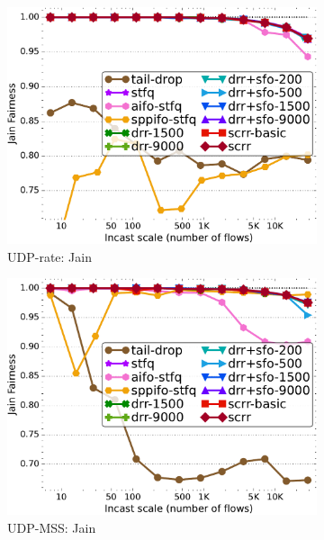 \begin{figure}[th!]
  \centering
  \begin{subfigure}[t]{.30\linewidth}
    \centering
    \includegraphics[width=0.95\linewidth]{figs/paral_cn_6u4x1024_Cb_7G_jain_comp_methods.pdf}
    \caption{UDP-rate: Jain}
    \label{fig:fairness-jain-udp-rate-full}
  \end{subfigure}
  \begin{subfigure}[t]{.30\linewidth}
    \centering
    \includegraphics[width=0.95\linewidth]{figs/paral_cn_6u4x1024_mss_2500_jain_comp_methods.pdf}
    \caption{UDP-MSS: Jain}
    \label{fig:fairness-jain-udp-mss-full}
  \end{subfigure}
  \begin{subfigure}[t]{.30\linewidth}

\end{subfigure}
\end{figure}
